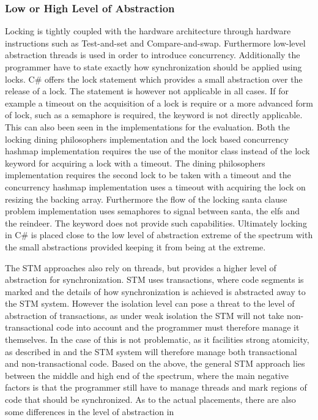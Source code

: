 \subsubsection{Low or High Level of Abstraction}\label{subsec:level_of_abstraction}
Locking is tightly coupled with the hardware architecture through hardware instructions such as Test-and-set and Compare-and-swap\cite[p. 1990]{scott2011sync}. Furthermore low-level abstraction threads is used in order to introduce concurrency. Additionally the programmer have to state exactly how synchronization should be applied using locks. C\# offers the lock  statement which provides a small abstraction over the release of a lock. The  statement is however not applicable in all cases. If for example a timeout on the acquisition of a lock is require or a more advanced form of lock, such as a semaphore is required, the  keyword is not directly applicable. This can also been seen in the implementations for the evaluation. Both the locking dining philosophers implementation and the lock based concurrency hashmap implementation requires the use of the monitor class instead of the lock keyword for acquiring a lock with a timeout. The dining philosophers implementation requires the second lock to be taken with a timeout and the concurrency hashmap implementation uses a timeout with acquiring the lock on resizing the backing array. Furthermore the flow of the locking santa clause problem implementation uses semaphores to signal between santa, the elfs and the reindeer. The  keyword does not provide such capabilities. Ultimately locking in C\# is placed close to the low level of abstraction extreme of the spectrum with the small abstractions provided keeping it from being at the extreme. 

The \ac{STM} approaches also rely on threads, but provides a higher level of abstraction for synchronization. \ac{STM} uses transactions, where code segments is marked and the details of how synchronization is achieved is abstracted away to the \ac{STM} system. However the isolation level can pose a threat to the level of abstraction of transactions, as under weak isolation the \ac{STM} will not take non-transactional code into account and the programmer must therefore manage it themselves. In the case of \stmnamesp this is not problematic, as it facilities strong atomicity, as described in  and the \ac{STM} system will therefore manage both transactional and non-transactional code. Based on the above, the general \ac{STM} approach lies between the middle and high end of the spectrum, where the main negative factors is that the programmer still have to manage threads and mark regions of code that should be synchronized.
As to the actual placements, there are also some differences in the level of abstraction in 

